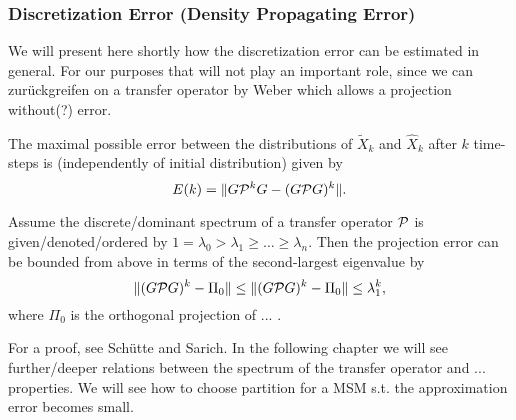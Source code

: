 


\subsubsection*{Discretization Error (Density Propagating Error)}
We will present here shortly how the discretization error can be estimated in general. For our purposes that will not play an important role, since we can zurückgreifen on a transfer operator by Weber which allows a projection without(?) error.

The maximal possible error between the distributions of $\widetilde{X}_k$ and $\widehat{X}_k$ after $k$ time-steps is (independently of initial distribution) given by 
\begin{equation*}
E(k) = \Vert G \mathcal{P}^k G - (G \mathcal{P} G)^k\Vert.
\end{equation*}

\begin{thm}
Assume the discrete/dominant spectrum of a transfer operator $\mathcal{P}$ is given/denoted/ordered by $1=\lambda_0 > \lambda_1 \geq \dots \geq \lambda_n$. Then the projection error can be bounded from above in terms of the second-largest eigenvalue by
\begin{equation*}
\Vert (G \mathcal{P} G)^k - \Pi_0\Vert \leq \Vert (G \mathcal{P} G)^k - \Pi_0\Vert \leq \lambda_1^k,
\end{equation*}
where $\Pi_0$ is the orthogonal projection of ... .
\end{thm}

For a proof, see Sch\"utte and Sarich\cite[p.72]{schutte2013metastability}.
In the following chapter we will see further/deeper relations between the spectrum of the transfer operator and ... properties.
We will see how to choose partition for a MSM s.t. the approximation error becomes small. 